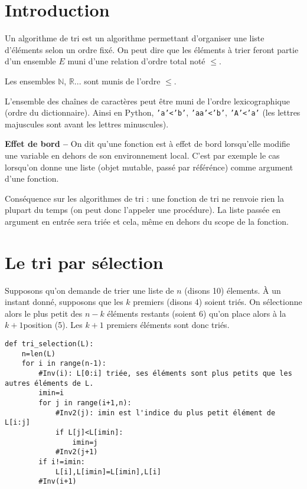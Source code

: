 \section{Introduction}
Un algorithme de tri est un algorithme permettant d'organiser une liste d'éléments selon un ordre fixé.  On peut dire que les éléments à trier feront partie d'un ensemble $E$ muni d'une relation d'ordre total noté $\leq$.
\begin{exemple}
Les ensembles $\mathbb{N}$, $\mathbb{R}$... sont munis de l'ordre $\leq$. 

L'ensemble des chaînes de caractères peut être muni de l'ordre lexicographique (ordre du dictionnaire). Ainsi en Python, \texttt{'a'<'b'}, \texttt{'aa'<'b'}, \texttt{'A'<'a'} (les lettres majuscules sont avant les lettres minuscules).
\end{exemple}

\begin{defi}\textbf{Effet de bord -- } On dit qu'une fonction est à effet de bord lorsqu'elle modifie une variable  en dehors de son environnement local. C'est par exemple le cas lorsqu'on donne une liste (objet mutable, passé par référénce) comme argument d'une fonction.

Conséquence sur les algorithmes de tri : une fonction de tri ne renvoie rien la plupart du temps (on peut donc l'appeler une procédure). La liste passée en argument en entrée sera triée et cela, même en dehors du scope de la fonction. 
\end{defi}


\section{Le tri par sélection}

Supposons qu'on demande de trier une liste de $n$ (disons 10) élements. À un instant donné, supposons que les $k$ premiers (disons 4) soient triés. On sélectionne alors le plus petit des $n-k$ éléments restants (soient 6) qu'on place alors à la $k+1$\ieme position (5\ieme). Les $k+1$ premiers éléments sont donc triés. 

\begin{lstlisting}	
def tri_selection(L):
    n=len(L)
    for i in range(n-1):
        #Inv(i): L[0:i] triée, ses éléments sont plus petits que les autres éléments de L.
        imin=i
        for j in range(i+1,n):
            #Inv2(j): imin est l'indice du plus petit élément de L[i:j]
            if L[j]<L[imin]:
                imin=j
            #Inv2(j+1)
        if i!=imin:
            L[i],L[imin]=L[imin],L[i]
        #Inv(i+1)
\end{lstlisting}	

